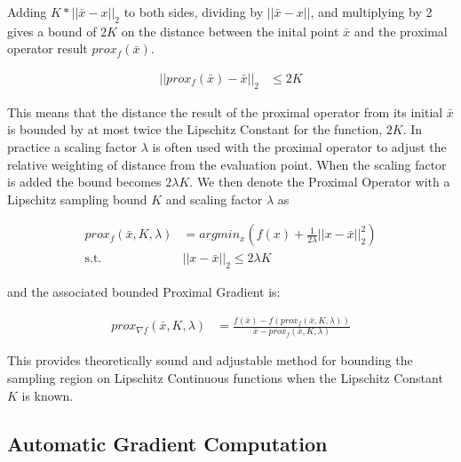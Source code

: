 Adding $K*||\bar{x}-x||_2$ to both sides, dividing by $||\bar{x}-x||$, and multiplying by 2 gives a bound of $2K$ on the distance between the inital point $\bar{x}$ and the proximal operator result $prox_f\left(\bar{x}\right)$. 


\vspace{-10pt}\begin{align}
    || prox_f(\bar{x})-\bar{x}||_2 &\leq 2K
\end{align}

This means that the distance the result of the proximal operator from its initial $\bar{x}$ is bounded by at most twice the Lipschitz Constant for the function, $2K$. In practice a scaling factor $\lambda$ is often used with the proximal operator to adjust the relative weighting of distance from the evaluation point. When the scaling factor is added the bound becomes $2 \lambda K$. We then denote the Proximal Operator with a Lipschitz sampling bound $K$ and scaling factor $\lambda$ as

\vspace{-10pt}\begin{align}
  prox_f\left(\bar{x}, K, \lambda\right) &= argmin_x \left(f\left(x\right) + \tfrac{1}{2\lambda}|| x-\bar{x}||_2^2\right) \nonumber\\
  \textrm{s.t. } &|| x-\bar{x}||_2 \leq 2 \lambda K
\end{align}

\noindent and the associated bounded Proximal Gradient is:

\vspace{-10pt}\begin{align}
prox_{\nabla f}\left(\bar{x}, K, \lambda\right) &= \frac{f\left(\bar{x}\right) - f\left(prox_f\left(\bar{x}, K, \lambda\right)\right)}{\bar{x} - prox_f\left(\bar{x}, K, \lambda\right)}
\end{align}

This provides theoretically sound and adjustable method for bounding the sampling region on Lipschitz Continuous functions when the Lipschitz Constant $K$ is known.



\subsection{Automatic Gradient Computation}

